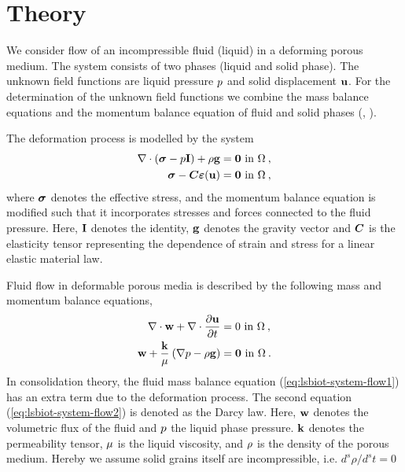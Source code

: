 \section{Theory}
We consider flow of an incompressible fluid (liquid) in a
deforming porous medium. The system consists of two phases (liquid
and solid phase). The unknown field functions are liquid pressure
$p$ and solid displacement $\mathbf u$. For the
determination of the unknown field functions we combine the mass
balance equations and the momentum balance equation of fluid and
solid phases (\cite{LewRobSch:89},  \cite{Kol:02}).

The deformation process is modelled by the system
\begin{align}
  \nabla \cdot ({\boldsymbol{\sigma}} - p \mathbf{I}) + \rho \mathbf{g}
  &=\mathbf{0}\mbox{ in }\Omega \: ,
  \label{eq:lsbiot-system-elas1} \\
  {\boldsymbol{\sigma}} - \boldsymbol{C} \boldsymbol{\varepsilon}(\mathbf u) &=\mathbf{0}\mbox{ in }\Omega \: ,
  \label{eq:lsbiot-system-elas2}
\end{align}
where ${\boldsymbol{\sigma}}$ denotes the effective stress,
and the momentum balance equation is modified such that it
incorporates stresses and forces connected to the fluid pressure.
Here, $\mathbf{I}$ denotes the identity, $\mathbf{g}$ denotes the
gravity vector and $\boldsymbol{C}$ is the elasticity tensor
representing the dependence of strain and stress for a linear
elastic material law.


Fluid flow in deformable porous media is described by the following mass and
momentum balance equations,
\begin{align}
  \nabla \cdot \mathbf{w} + \nabla \cdot \frac{\partial \mathbf u}{\partial t}
  & = 0 \mbox{ in } \Omega \: ,
  \label{eq:lsbiot-system-flow1} \\
  \mathbf{w} + \frac{\mathbf{k}}{\mu} \: (\nabla p - \rho \mathbf{g})
  &=\mathbf{0}\mbox{ in }\Omega \: .
  \label{eq:lsbiot-system-flow2}
\end{align}
In consolidation theory, the fluid mass balance equation
(\ref{eq:lsbiot-system-flow1}) has an extra term due to the
deformation process. The second equation
(\ref{eq:lsbiot-system-flow2}) is denoted as the Darcy law. Here,
$\mathbf{w}$ denotes the volumetric flux of the fluid and
$p$ the liquid phase pressure. $\mathbf{k}$ denotes the
permeability tensor, $\mu$ is the liquid viscosity, and
$\rho$ is the density of the porous medium. Hereby we assume
solid grains itself are incompressible, i.e. $d^s\rho/d^s t = 0$

